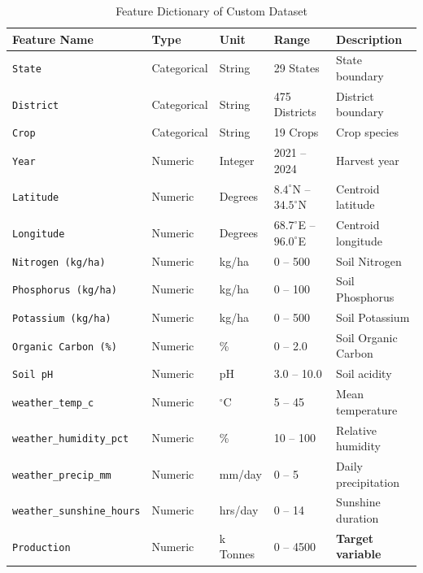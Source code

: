 \documentclass[11pt,a4paper]{article}
\begin{document}
\begin{table}[H]
\caption{Feature Dictionary of Custom Dataset}
\label{tab:feature_dictionary}
\centering
\small
\begin{tabular}{lllll}
\toprule
\textbf{Feature Name} & \textbf{Type} & \textbf{Unit} & \textbf{Range} & \textbf{Description} \\
\midrule
\texttt{State} & Categorical & String & 29 States & State boundary \\
\texttt{District} & Categorical & String & 475 Districts & District boundary \\
\texttt{Crop} & Categorical & String & 19 Crops & Crop species \\
\texttt{Year} & Numeric & Integer & 2021 -- 2024 & Harvest year \\
\texttt{Latitude} & Numeric & Degrees & $8.4^\circ$N -- $34.5^\circ$N & Centroid latitude \\
\texttt{Longitude} & Numeric & Degrees & $68.7^\circ$E -- $96.0^\circ$E & Centroid longitude \\
\texttt{Nitrogen (kg/ha)} & Numeric & kg/ha & 0 -- 500 & Soil Nitrogen \\
\texttt{Phosphorus (kg/ha)} & Numeric & kg/ha & 0 -- 100 & Soil Phosphorus \\
\texttt{Potassium (kg/ha)} & Numeric & kg/ha & 0 -- 500 & Soil Potassium \\
\texttt{Organic Carbon (\%)} & Numeric & \% & 0 -- 2.0 & Soil Organic Carbon \\
\texttt{Soil pH} & Numeric & pH & 3.0 -- 10.0 & Soil acidity \\
\texttt{weather\_temp\_c} & Numeric & $^\circ$C & 5 -- 45 & Mean temperature \\
\texttt{weather\_humidity\_pct} & Numeric & \% & 10 -- 100 & Relative humidity \\
\texttt{weather\_precip\_mm} & Numeric & mm/day & 0 -- 5 & Daily precipitation \\
\texttt{weather\_sunshine\_hours} & Numeric & hrs/day & 0 -- 14 & Sunshine duration \\
\texttt{Production} & Numeric & k Tonnes & 0 -- 4500 & \textbf{Target variable} \\
\bottomrule
\end{tabular}
\end{table}
\end{document}
